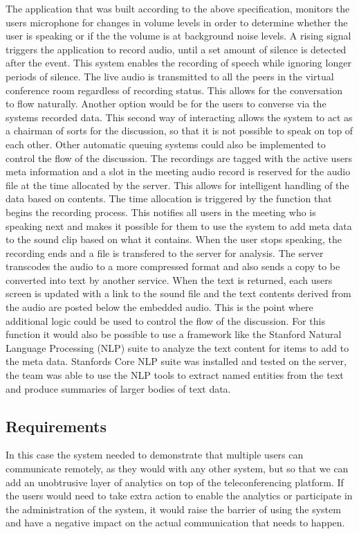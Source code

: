 \documentclass[english,12pt,a4paper,dvips]{article}
\begin{document}
The application that was built according to the above specification, monitors the users microphone for changes in volume levels in order to determine whether the user is speaking or if the the volume is at background noise levels. A rising signal triggers the application to record audio, until a set amount of silence is detected after the event. This system enables the recording of speech while ignoring longer periods of silence. The live audio is transmitted to all the peers in the virtual conference room regardless of recording status. This allows for the conversation to flow naturally. Another option would be for the users to converse via the systems recorded data. This second way of interacting allows the system to act as a chairman of sorts for the discussion, so that it is not possible to speak on top of each other. Other automatic queuing systems could also be implemented to control the flow of the discussion. The recordings are tagged with the active users meta information and a slot in the meeting audio record is reserved for the audio file at the time allocated by the server. This allows for intelligent handling of the data based on contents. The time allocation is triggered by the function that begins the recording process. This notifies all users in the meeting who is speaking next and makes it possible for them to use the system to add meta data to the sound clip based on what it contains. When the user stops speaking, the recording ends and a file is transfered to the server for analysis. The server transcodes the audio to a more compressed format and also sends a copy to be converted into text by another service. When the text is returned, each users screen is updated with a link to the sound file and the text contents derived from the audio are posted below the embedded audio. This is the point where additional logic could be used to control the flow of the discussion. For this function it would also be possible to use a framework like the Stanford Natural Language Processing (NLP) suite to analyze the text content for items to add to the meta data. Stanfords Core NLP suite was installed and tested on the server, the team was able to use the NLP tools to extract named entities from the text and produce summaries of larger bodies of text data.

\subsection{Requirements}

In this case the system needed to demonstrate that multiple users can communicate remotely, as they would with any other system, but so that we can add an unobtrusive layer of analytics on top of the teleconferencing platform. If the users would need to take extra action to enable the analytics or participate in the administration of the system, it would raise the barrier of using the system and have a negative impact on the actual communication that needs to happen. 
\end{document}
